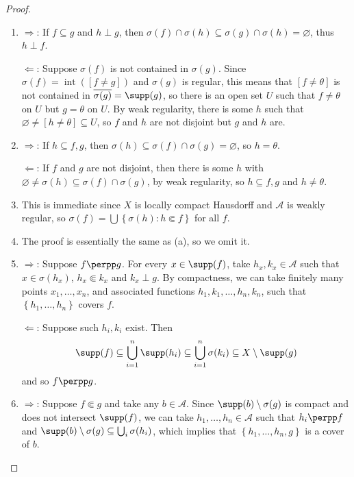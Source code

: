 \begin{proof}
\begin{enumerate}
\item[(a)] $\Rightarrow$: If $f\subseteq g$ and $h\perp g$, then $\sigma(f)\cap\sigma(h)\subseteq\sigma(g)\cap\sigma(h)=\varnothing$, thus $h\perp f$.

$\Leftarrow$: Suppose $\sigma(f)$ is not contained in $\sigma(g)$. Since $\sigma(f)=\operatorname{int}([f\neq g])$ and $\sigma(g)$ is regular, this means that $[f\neq\theta]$ is not contained in $\overline{\sigma(g)}=\supp(g)$, so there is an open  set $U$ such that $f\neq\theta$ on $U$ but $g=\theta$ on $U$. By weak regularity, there is some $h$ such that $\varnothing\neq[h\neq\theta]\subseteq U$, so $f$ and $h$ are not disjoint but $g$ and $h$ are.

\item[(b)] $\Rightarrow$: If $h\subseteq f,g$, then $\sigma(h)\subseteq\sigma(f)\cap\sigma(g)=\varnothing$, so $h=\theta$.

$\Leftarrow$: If $f$ and $g$ are not disjoint, then there is some $h$ with $\varnothing\neq\sigma(h)\subseteq\sigma(f)\cap\sigma(g)$, by weak regularity, so $h\subseteq f,g$ and $h\neq\theta$.

\item[(c)] This is immediate since $X$ is locally compact Hausdorff and $\mathcal{A}$ is weakly regular, so $\sigma(f)=\bigcup\left\{\sigma(h):h\Subset f\right\}$ for all $f$.

\item[(d)] The proof is essentially the same as (a), so we omit it. %


\item[(e)] $\Rightarrow$: Suppose $f\perpp g$. For every $x\in\supp(f)$, take $h_x,k_x\in\mathcal{A}$ such that $x\in\sigma(h_x)$, $h_x\Subset k_x$ and $k_x\perp g$. By compactness, we can take finitely many points $x_1,\ldots,x_n$, and associated functions $h_1,k_1,\ldots,h_n,k_n$, such that $\left\{h_1,\ldots,h_n\right\}$ covers $f$.

$\Leftarrow$: Suppose such $h_i,k_i$ exist. Then
\[\supp(f)\subseteq\bigcup_{i=1}^n\supp(h_i)\subseteq\bigcup_{i=1}^n\sigma(k_i)\subseteq X\setminus\supp(g)\]
and so $f\perpp g$.
\item[(f)] $\Rightarrow$: Suppose $f\Subset g$ and take any $b\in\mathcal{A}$. Since $\supp(b)\setminus\sigma(g)$ is compact and does not intersect $\supp(f)$, we can take $h_1,\ldots,h_n\in\mathcal{A}$ such that $h_i\perpp f$ and $\supp(b)\setminus\sigma(g)\subseteq\bigcup_i\sigma(h_i)$, which implies that $\left\{h_1,\ldots,h_n,g\right\}$ is a cover of $b$.


\end{enumerate}
\end{proof}
